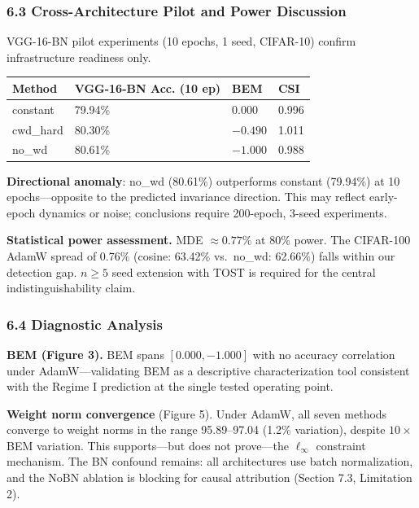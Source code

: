 \documentclass[
]{article}
\begin{document}
\hypertarget{cross-architecture-pilot-and-power-discussion}{%
\subsubsection{6.3 Cross-Architecture Pilot and Power
Discussion}\label{cross-architecture-pilot-and-power-discussion}}

VGG-16-BN pilot experiments (10 epochs, 1 seed, CIFAR-10) confirm
infrastructure readiness only.

\begin{longtable}[]{@{}llll@{}}
\toprule\noalign{}
Method & VGG-16-BN Acc. (10 ep) & BEM & CSI \\
\midrule\noalign{}
\endhead
\bottomrule\noalign{}
\endlastfoot
constant & 79.94\% & 0.000 & 0.996 \\
cwd\_hard & 80.30\% & \(-0.490\) & 1.011 \\
no\_wd & 80.61\% & \(-1.000\) & 0.988 \\
\end{longtable}

\textbf{Directional anomaly}: no\_wd (80.61\%) outperforms constant
(79.94\%) at 10 epochs---opposite to the predicted invariance direction.
This may reflect early-epoch dynamics or noise; conclusions require
200-epoch, 3-seed experiments.

\textbf{Statistical power assessment.} MDE \(\approx 0.77\%\) at 80\%
power. The CIFAR-100 AdamW spread of 0.76\% (cosine: 63.42\% vs.~no\_wd:
62.66\%) falls within our detection gap. \(n \geq 5\) seed extension
with TOST is required for the central indistinguishability claim.

\hypertarget{diagnostic-analysis}{%
\subsubsection{6.4 Diagnostic Analysis}\label{diagnostic-analysis}}

\textbf{BEM (Figure 3).} BEM spans \([0.000, -1.000]\) with no accuracy
correlation under AdamW---validating BEM as a descriptive
characterization tool consistent with the Regime I prediction at the
single tested operating point.

\textbf{Weight norm convergence} (Figure 5). Under AdamW, all seven
methods converge to weight norms in the range 95.89--97.04 (1.2\%
variation), despite \(10\times\) BEM variation. This supports---but does
not prove---the \(\ell_\infty\) constraint mechanism. The BN confound
remains: all architectures use batch normalization, and the NoBN
ablation is blocking for causal attribution (Section 7.3, Limitation 2).
\end{document}

